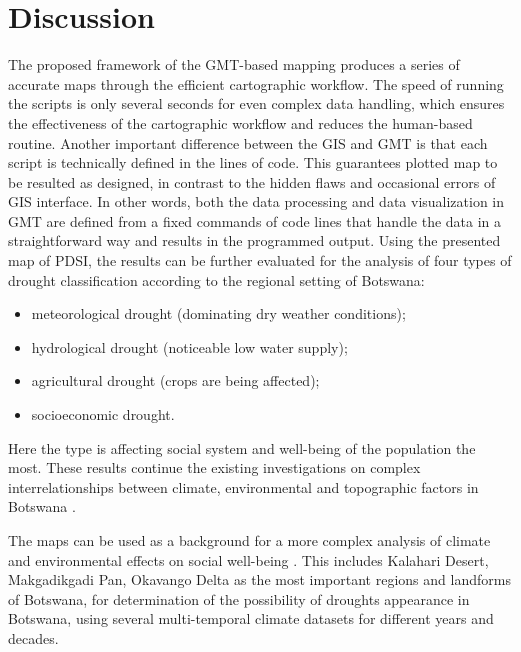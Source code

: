 \documentclass[ijgi,article,submit,pdftex,moreauthors]{Definitions/mdpi}
\begin{document}
\section{Discussion}

The proposed framework of the GMT-based mapping produces a series of accurate maps through the efficient cartographic workflow. The speed of running the scripts is only several seconds for even complex data handling, which ensures the effectiveness of the cartographic workflow and reduces the human-based routine. Another important difference between the GIS and GMT is that each script is technically defined in the lines of code. This guarantees plotted map to be resulted as designed, in contrast to the hidden flaws and occasional errors of GIS interface. In other words, both the data processing and data visualization in GMT are defined from a fixed commands of code lines that handle the data in a straightforward way and results in the programmed output. Using the presented map of PDSI, the results can be further evaluated for the analysis of four types of drought classification according to the regional setting of Botswana: 

    \begin{itemize}
        \item[$-$] meteorological drought (dominating dry weather conditions); 
        \item[$-$] hydrological drought (noticeable low water supply); 
        \item[$-$] agricultural drought (crops are being affected); 
        \item[$-$] socioeconomic drought. 
   \end{itemize} 
      
        Here the  type is affecting social system and well-being of the population the most. These results continue the existing investigations on complex interrelationships between climate, environmental and topographic factors in Botswana \cite{McGill,Maoyi,Ramberg2006b,Maoyi}. 

The maps can be used as a background for a more complex analysis of climate and environmental effects on social well-being \cite{Asefa,Vanderpost1995,Rahm,Mogomotsi}. This includes Kalahari Desert, Makgadikgadi Pan, Okavango Delta as the most important regions and landforms of Botswana, for determination of the possibility of droughts appearance in Botswana, using several multi-temporal climate datasets for different years and decades. 
\end{document}
